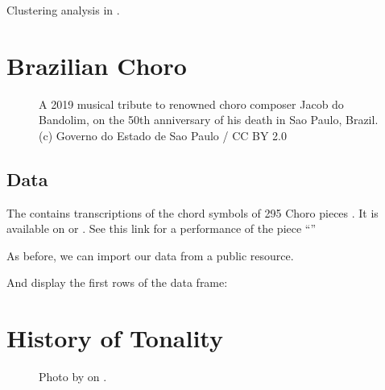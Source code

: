 \documentclass[letterpaper,10pt,english]{sphinxmanual}
\begin{document}
Clustering analysis in .


\chapter{Brazilian Choro}
\label{\detokenize{choro:brazilian-choro}}\label{\detokenize{choro::doc}}
\begin{figure}[htbp]
\centering
\capstart

\noindent{}
\caption{A 2019 musical tribute to renowned choro composer Jacob do Bandolim,
on the 50th anniversary of his death in Sao Paulo, Brazil. (c) Governo do Estado de Sao Paulo / CC BY 2.0}\label{\detokenize{choro:id2}}\end{figure}


\section{Data}
\label{\detokenize{choro:data}}
The  contains transcriptions of the chord symbols
of 295 Choro pieces . It is available on  or .
See this link for a performance of the piece “”

As before, we can import our data from a public resource.

\begin{sphinxVerbatim}[commandchars=\\\{\}]
   \PYGZbs{}
\end{sphinxVerbatim}

And display the first rows of the data frame:

\begin{sphinxVerbatim}[commandchars=\\\{\}]
\end{sphinxVerbatim}


\chapter{History of Tonality}
\label{\detokenize{tonality:history-of-tonality}}\label{\detokenize{tonality::doc}}
\begin{figure}[htbp]
\centering
\capstart

\noindent{}
\caption{Photo by 
on .}\label{\detokenize{tonality:id5}}\end{figure}
\end{document}
